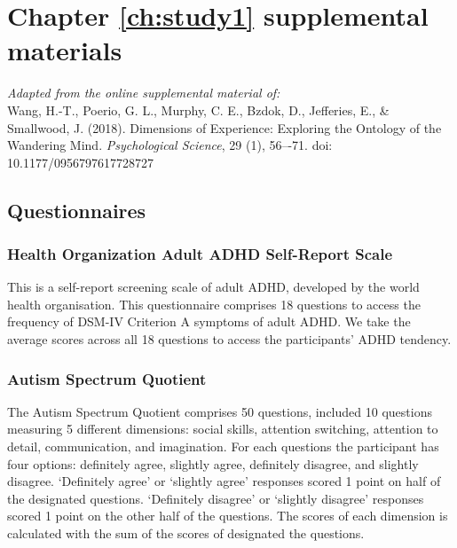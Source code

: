 
\appendix
\setcounter{chapter}{0}

\renewcommand{\chaptername}{Appendix}
\renewcommand{\theequation}{\Alph{chapter}.\arabic{section}.\arabic{equation}}
\setcounter{equation}{0}


\chapter{Chapter \ref{ch:study1} supplemental materials}
\label{appendix:study1}
\textit{Adapted from the online supplemental material of: }\\
Wang, H.-T., Poerio, G. L., Murphy, C. E., Bzdok, D., Jefferies, E., \& Smallwood, J. (2018). Dimensions of Experience: Exploring the Ontology of the Wandering Mind. \textit{Psychological Science}, 29 (1), 56–-71. doi: 10.1177/0956797617728727
\section{Questionnaires}
\label{appendix:study1:subsection1}

\subsection{Health Organization Adult ADHD Self-Report Scale}
This is a self-report screening scale of adult ADHD, developed by the world health organisation\cite{Kessler2005}. This questionnaire comprises 18 questions to access the frequency of DSM-IV Criterion A symptoms of adult ADHD. We take the average scores across all 18 questions to access the participants’ ADHD tendency.

\subsection{Autism Spectrum Quotient}
The Autism Spectrum Quotient \cite{Baron-Cohen2001} comprises 50 questions, included 10 questions measuring 5 different dimensions: social skills, attention switching, attention to detail, communication, and imagination. For each questions the participant has four options: definitely agree, slightly agree, definitely disagree, and slightly disagree. ‘Definitely agree’ or ‘slightly agree’ responses scored 1 point on half of the designated questions.  ‘Definitely disagree’ or ‘slightly disagree’ responses scored 1 point on the other half of the questions.  The scores of each dimension is calculated with the sum of the scores of designated the questions.

